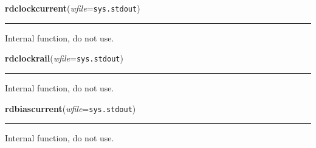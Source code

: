     \label{pydsp:rdclockcurrent}

    \vspace{0.5ex}

    \begin{boxedminipage}{\textwidth}

    \raggedright \textbf{rdclockcurrent}(\textit{wfile}=\texttt{sys.stdout})

    \vspace{-1.5ex}

    \rule{\textwidth}{0.5\fboxrule}
    Internal function, do not use.

    \vspace{1ex}

    \end{boxedminipage}

    \label{pydsp:rdclockrail}

    \vspace{0.5ex}

    \begin{boxedminipage}{\textwidth}

    \raggedright \textbf{rdclockrail}(\textit{wfile}=\texttt{sys.stdout})

    \vspace{-1.5ex}

    \rule{\textwidth}{0.5\fboxrule}
    Internal function, do not use.

    \vspace{1ex}

    \end{boxedminipage}

    \label{pydsp:rdbiascurrent}

    \vspace{0.5ex}

    \begin{boxedminipage}{\textwidth}

    \raggedright \textbf{rdbiascurrent}(\textit{wfile}=\texttt{sys.stdout})

    \vspace{-1.5ex}

    \rule{\textwidth}{0.5\fboxrule}
    Internal function, do not use.

    \vspace{1ex}

    \end{boxedminipage}

